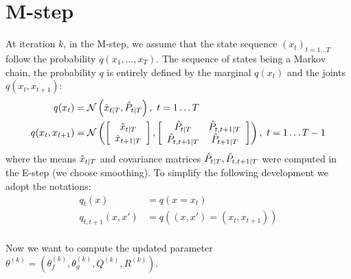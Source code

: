 \section{M-step}

At iteration $k$, in the M-step, we assume that the state sequence $(x_t)_{t=1 \ldots T}$ follow the probability $q \left(x_1, \ldots ,x_T \right)$. The sequence of states being a Markov chain, the probability $q$ is entirely defined by the marginal $q(x_t)$ and the joints $q(x_t,x_{t+1})$:
\begin{align*}
  q(x_t) &= \mathcal{N}\left( \hat{x}_{t \mathbin{\vert} T}, \hat{P}_{t \mathbin{\vert} T} \right), \  t=1 \ldots T\\
  q(x_t, x_{t+1}) &=
  \mathcal{N}
    \left(
      \left[
        \begin{array}{c} \hat{x}_{t \mathbin{\vert} T} \\ \hat{x}_{t+1 \mathbin{\vert} T} \end{array}
      \right],
      \left[
        \begin{array}{cc} \hat{P}_{t \mathbin{\vert} T} & \hat{P}_{t,t+1 \mathbin{\vert} T}\\ \hat{P}_{t,t+1 \mathbin{\vert} T} & \hat{P}_{t+1 \mathbin{\vert} T} \end{array}
      \right]
    \right), \  t=1 \ldots T-1\\
\end{align*}
where the means $\hat{x}_{t \mathbin{\vert} T}$ and covariance matrices $\hat{P}_{t \mathbin{\vert} T}, \hat{P}_{t,t+1 \mathbin{\vert} T}$ were computed in the E-step (we choose smoothing).
To simplify the following development we adopt the notations:
\begin{align*}
  q_t(x) &= q(x = x_t)\\
  q_{t,t+1}(x,x') &= q \left((x,x') = (x_t, x_{t+1})\right)\\
\end{align*}

Now we want to compute the updated parameter $\theta^{(k)} = \left( \theta_f^{(k)}, \theta_g^{(k)}, Q^{(k)}, R^{(k)} \right)$.

